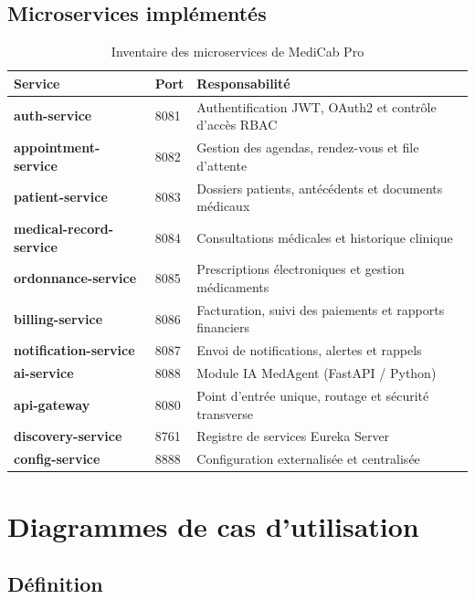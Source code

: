 \subsection{Microservices implémentés}

\begin{table}[H]
\centering
\caption{Inventaire des microservices de MediCab Pro}
\label{tab:microservices}
\renewcommand{\arraystretch}{1.4}
\begin{tabularx}{\textwidth}{|>{\bfseries\ttfamily}p{4cm}|p{1.5cm}|X|}
\hline
\textbf{Service} & \textbf{Port} & \textbf{Responsabilité} \\
\hline
auth-service & 8081 & Authentification JWT, OAuth2 et contrôle d'accès RBAC \\
\hline
appointment-service & 8082 & Gestion des agendas, rendez-vous et file d'attente \\
\hline
patient-service & 8083 & Dossiers patients, antécédents et documents médicaux \\
\hline
medical-record-service & 8084 & Consultations médicales et historique clinique \\
\hline
ordonnance-service & 8085 & Prescriptions électroniques et gestion médicaments \\
\hline
billing-service & 8086 & Facturation, suivi des paiements et rapports financiers \\
\hline
notification-service & 8087 & Envoi de notifications, alertes et rappels \\
\hline
ai-service & 8088 & Module IA MedAgent (FastAPI / Python) \\
\hline
api-gateway & 8080 & Point d'entrée unique, routage et sécurité transverse \\
\hline
discovery-service & 8761 & Registre de services Eureka Server \\
\hline
config-service & 8888 & Configuration externalisée et centralisée \\
\hline
\end{tabularx}
\end{table}

\section{Diagrammes de cas d'utilisation}

\subsection{Définition}

